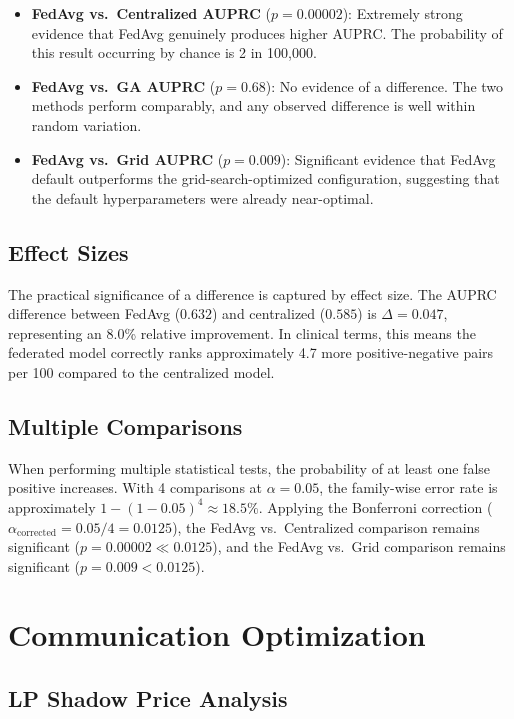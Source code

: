 \documentclass[11pt,a4paper]{report}
\begin{document}
\begin{itemize}[leftmargin=2em]
\item \textbf{FedAvg vs.\ Centralized AUPRC} ($p = 0.00002$): Extremely strong evidence that FedAvg genuinely produces higher AUPRC. The probability of this result occurring by chance is 2 in 100,000.
\item \textbf{FedAvg vs.\ GA AUPRC} ($p = 0.68$): No evidence of a difference. The two methods perform comparably, and any observed difference is well within random variation.
\item \textbf{FedAvg vs.\ Grid AUPRC} ($p = 0.009$): Significant evidence that FedAvg default outperforms the grid-search-optimized configuration, suggesting that the default hyperparameters were already near-optimal.
\end{itemize}

\section{Effect Sizes}

The practical significance of a difference is captured by effect size. The AUPRC difference between FedAvg ($0.632$) and centralized ($0.585$) is $\Delta = 0.047$, representing an 8.0\% relative improvement. In clinical terms, this means the federated model correctly ranks approximately 4.7 more positive-negative pairs per 100 compared to the centralized model.

\section{Multiple Comparisons}

When performing multiple statistical tests, the probability of at least one false positive increases. With 4 comparisons at $\alpha = 0.05$, the family-wise error rate is approximately $1 - (1-0.05)^4 \approx 18.5\%$. Applying the Bonferroni correction ($\alpha_{\text{corrected}} = 0.05/4 = 0.0125$), the FedAvg vs.\ Centralized comparison remains significant ($p = 0.00002 \ll 0.0125$), and the FedAvg vs.\ Grid comparison remains significant ($p = 0.009 < 0.0125$).


\chapter{Communication Optimization}

\section{LP Shadow Price Analysis}
\end{document}
